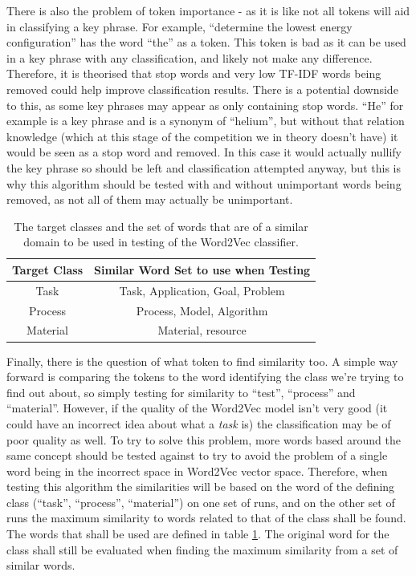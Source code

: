 There is also the problem of token importance - as it is like not all tokens will aid in classifying a key phrase. For example, ``determine the lowest energy configuration'' has the word ``the'' as a token. This token is bad as it can be used in a key phrase with any classification, and likely not make any difference. Therefore, it is theorised that stop words and very low TF-IDF words being removed could help improve classification results. There is a potential downside to this, as some key phrases may appear as only containing stop words. ``He'' for example is a key phrase and is a synonym of ``helium'', but without that relation knowledge (which at this stage of the competition we in theory doesn't have) it would be seen as a stop word and removed. In this case it would actually nullify the key phrase so should be left and classification attempted anyway, but this is why this algorithm should be tested with and without unimportant words being removed, as not all of them may actually be unimportant.
\begin{table}
	\centering
	\begin{tabular}{ c | c }
		\textbf{Target Class} & \textbf{Similar Word Set to use when Testing} \\
		\hline
		Task & Task, Application, Goal, Problem \\
		 \hline
		Process & Process, Model, Algorithm\\
		 \hline
		Material & Material, resource \\
	\end{tabular}
	\caption[Word2Vec Classification Target Words]{The target classes and the set of words that are of a similar domain to be used in testing of the Word2Vec classifier.}
	\label{table:w2vclasswords}
\end{table}

Finally, there is the question of what token to find similarity too. A simple way forward is comparing the tokens to the word identifying the class we're trying to find out about, so simply testing for similarity to ``test'', ``process'' and ``material''. However, if the quality of the Word2Vec model isn't very good (it could have an incorrect idea about what a \textit{task} is) the classification may be of poor quality as well. To try to solve this problem, more words based around the same concept should be tested against to try to avoid the problem of a single word being in the incorrect space in Word2Vec vector space. Therefore, when testing this algorithm the similarities will be based on the word of the defining class (``task'', ``process'', ``material'') on one set of runs, and on the other set of runs the maximum similarity to words related to that of the class shall be found. The words that shall be used are defined in table \ref{table:w2vclasswords}. The original word for the class shall still be evaluated when finding the maximum similarity from a set of similar words.

